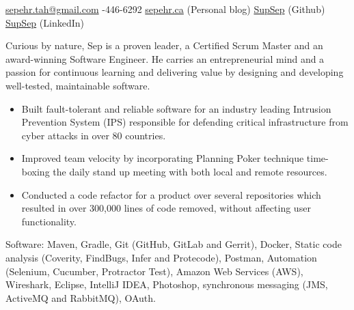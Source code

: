 \documentclass[10pt,a4paper]{article}
\begin{document}
\sloppy{}  %


\vspace

\noindent\href{mailto:sepehr.tah.at.gmail.dot.com}{sepehr.tah\mbox{}@\mbox{}gmail.com}\sbull
{}-446-6292\sbull
\href{https://sepehr.ca}{sepehr.ca} (Personal blog) \sbull
\href{https://github.com/supsep}{SupSep} (Github) \sbull
\href{http://www.linkedin.com/in/supsep}{SupSep} (LinkedIn) 


\spacedhrule{0.9em}{-0.4em}  %


Curious by nature, Sep is a proven leader, a Certified Scrum Master and an 
award-winning Software Engineer. He carries an entrepreneurial
mind and a passion for continuous learning and delivering value
by designing and developing well-tested, maintainable software.

\noindent\begin{itemize}
\item Built fault-tolerant and reliable software for an industry leading Intrusion Prevention System (IPS) responsible for defending critical infrastructure from cyber attacks in over 80 countries.
\item Improved team velocity by incorporating Planning Poker technique time-boxing the daily stand up meeting with both local and remote resources.
\item Conducted a code refactor for a product over several repositories which resulted in over 300,000 lines of code removed, without affecting user functionality.
\end{itemize}


\vspace{1em}
\spacedhrule{0em}{-0.4em}

\inlineheadsection  %
  {Software:}
  {Maven, Gradle, Git (GitHub, GitLab and Gerrit), Docker, Static code analysis (Coverity, FindBugs, Infer and Protecode), Postman, Automation (Selenium, Cucumber, Protractor Test), Amazon Web Services (AWS), Wireshark, Eclipse, IntelliJ IDEA, Photoshop, synchronous messaging (JMS, ActiveMQ and RabbitMQ), OAuth.}
\end{document}
